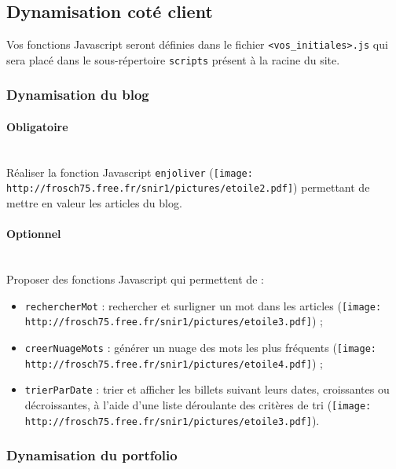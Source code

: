 \documentclass[a4paper,12pt]{article}
\newcommand\Code[1]{\textcolor{couleur_code}{\texttt{#1}}}
\begin{document}
\subsection{Dynamisation coté client}
Vos fonctions Javascript seront définies dans le fichier \Code{<vos\_initiales>.js} 
qui sera placé dans le sous-répertoire \Code{scripts} présent à la racine du 
site. 

\subsubsection{Dynamisation du blog}
\paragraph*{Obligatoire}~\\
Réaliser la fonction Javascript
\Code{enjoliver} (\texttt{[image: http://frosch75.free.fr/snir1/pictures/etoile2.pdf]})
permettant de mettre en valeur les articles du blog. 

\paragraph*{Optionnel}~\\
Proposer des fonctions Javascript qui permettent de : 
\vspace{3pt}

\begin{itemize}
  \item \Code{rechercherMot} : rechercher et surligner un mot dans les articles 
        (\texttt{[image: http://frosch75.free.fr/snir1/pictures/etoile3.pdf]}) ;
  \item \Code{creerNuageMots} : générer un nuage des mots les plus fréquents 
        (\texttt{[image: http://frosch75.free.fr/snir1/pictures/etoile4.pdf]}) ;
  \item \Code{trierParDate} : trier et afficher les billets suivant leurs dates,
        croissantes
        ou décroissantes, à l'aide d'une liste déroulante des critères de tri 
        (\texttt{[image: http://frosch75.free.fr/snir1/pictures/etoile3.pdf]}).
\end{itemize}

\subsubsection{Dynamisation du portfolio}
\end{document}
